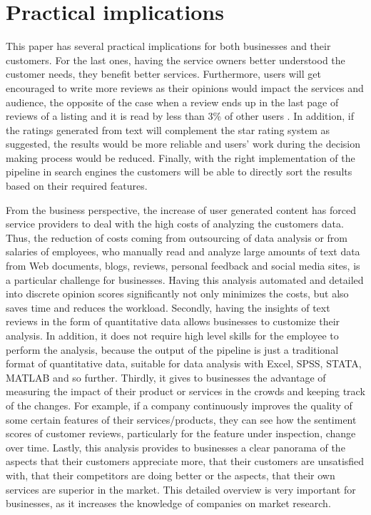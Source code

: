 
\section{Practical implications}
This paper has several practical implications for both businesses and their customers. For the last ones, having the service owners better understood the customer needs, they benefit better services. Furthermore, users will get encouraged to write more reviews as their opinions would impact the services and audience, the opposite of the case when a review ends up in the last page of reviews of a listing and it is read by less than 3\% of other users \cite{pavlou2006institutional}. In addition, if the ratings generated from text will complement the star rating system as suggested, the results would be more reliable and users' work during the decision making process would be reduced. Finally, with the right implementation of the pipeline in search engines the customers will be able to directly sort the results based on their required features. 

From the business perspective, the increase of user generated content has forced service providers to deal with the high costs of analyzing the customers data. Thus, the reduction of costs coming from outsourcing of data analysis or from salaries of employees, who manually read and analyze large amounts of text data from Web documents, blogs, reviews, personal feedback and social media sites, is a particular challenge for businesses. Having this analysis automated and detailed into discrete opinion scores significantly not only minimizes the costs, but also saves time and reduces the workload. Secondly, having the insights of text reviews in the form of quantitative data allows businesses to customize their analysis. In addition, it does not require high level skills for the employee to perform the analysis, because the output of the pipeline is just a traditional format of quantitative data, suitable for data analysis with Excel, SPSS, STATA, MATLAB and so further. Thirdly, it gives to businesses the advantage of measuring the impact of their product or services in the crowds and keeping track of the changes. For example, if a company continuously improves the quality of some certain features of their services/products, they can see how the sentiment scores of customer reviews, particularly for the feature under inspection, change over time. Lastly, this analysis provides to businesses a clear panorama of the aspects that their customers appreciate more, that their customers are unsatisfied with, that their competitors are doing better or the aspects, that their own services are superior in the market. This detailed overview is very important for businesses, as it increases the knowledge of companies on market research. 